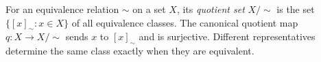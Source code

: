 
For an equivalence relation $\sim$ on a set $X$, its \emph{quotient set} $X/{\sim}$ is the set $\{[x]_\sim:x\in X\}$ of all equivalence classes. The canonical quotient map $q:X\to X/{\sim}$ sends $x$ to $[x]_\sim$ and is surjective. Different representatives determine the same class exactly when they are equivalent.
